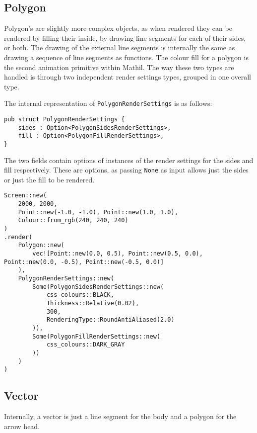 
\subsection{Polygon}

Polygon's are slightly more complex objects, as when rendered they can be rendered by filling their inside, by drawing line segments for each of their sides, or both. The drawing of the external line segments is internally the same as drawing a sequence of line segments as functions. The colour fill for a polygon is the second animation primitive within Mathil. The way these two types are handled is through two independent render settings types, grouped in one overall type.

The internal representation of \verb|PolygonRenderSettings| is as follows:

\begin{lstlisting}
pub struct PolygonRenderSettings {
    sides : Option<PolygonSidesRenderSettings>,
    fill : Option<PolygonFillRenderSettings>,
}   
\end{lstlisting}

The two fields contain options of instances of the render settings for the sides and fill respectively. These are options, as passing \verb|None| as input allows just the sides or just the fill to be rendered.

\begin{lstlisting}
Screen::new(
    2000, 2000,
    Point::new(-1.0, -1.0), Point::new(1.0, 1.0),
    Colour::from_rgb(240, 240, 240)
)
.render(
    Polygon::new(
        vec![Point::new(0.0, 0.5), Point::new(0.5, 0.0), Point::new(0.0, -0.5), Point::new(-0.5, 0.0)]
    ),
    PolygonRenderSettings::new(
        Some(PolygonSidesRenderSettings::new(
            css_colours::BLACK,
            Thickness::Relative(0.02),
            300,
            RenderingType::RoundAntiAliased(2.0)
        )),
        Some(PolygonFillRenderSettings::new(
            css_colours::DARK_GRAY
        ))
    )
)
\end{lstlisting}


\subsection{Vector}

Internally, a vector is just a line segment for the body and a polygon for the arrow head.

